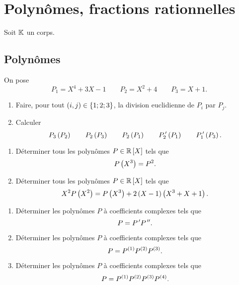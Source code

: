 \chapter{Polynômes, fractions rationnelles}

Soit \(\mathbb{K}\) un corps.

\section{Polynômes}

\begin{exo}
On pose \[P_1=X^4+3X-1\qquad P_2=X^2+4\qquad P_3=X+1.\]

\begin{enumerate}
\item Faire, pour tout \(\left(i,j\right)\in\left\lbrace1;2;3\right\rbrace\), la division euclidienne de \(P_i\) par \(P_j\). \\

\item Calculer \[P_3\left(P_2\right)\qquad P_2\left(P_3\right)\qquad P_2\left(P_1\right)\qquad P_2^{\,\prime}\left(P_1\right)\qquad P_1^{\,\prime}\left(P_3\right).\]
\end{enumerate}
\end{exo}

\begin{corr}
\end{corr}

\begin{exo}
\begin{enumerate}
\item Déterminer tous les polynômes \(P\in\poly[\R]\) tels que \[P\left(X^3\right)=P^2.\]

\item Déterminer tous les polynômes \(P\in\poly[\R]\) tels que \[X^2P\left(X^2\right)=P\left(X^3\right)+2\left(X-1\right)\left(X^3+X+1\right).\]
\end{enumerate}
\end{exo}

\begin{corr}
\end{corr}

\begin{exo}
\begin{enumerate}
\item Déterminer les polynômes \(P\) à coefficients complexes tels que \[P=P^{\,\prime} P^{\,\prime\prime}.\]

\item Déterminer les polynômes \(P\) à coefficients complexes tels que \[P=P^{\left(1\right)}P^{\left(2\right)}P^{\left(3\right)}.\]

\item Déterminer les polynômes \(P\) à coefficients complexes tels que \[P=P^{\left(1\right)}P^{\left(2\right)}P^{\left(3\right)}P^{\left(4\right)}.\]
\end{enumerate}
\end{exo}

